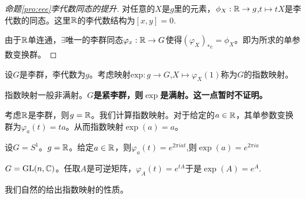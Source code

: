 \begin{proof}[命题\ref{pro:eee}李代数同态的提升]
    对任意的$X$是$g$里的元素，$\phi_X:\mathbb{R} \to g$,$t \mapsto tX$是李代数的同态。这里$\mathbb{R}$的李代数结构为$[x,y]=0$.

    由于$\mathbb{R}$单连通，$\exists$唯一的李群同态$\varphi_x:\mathbb{R} \to G$使得$(\varphi_X)_{*e}=\phi_X$。即为所求的单参数变换群。
\end{proof}
\begin{definition}[李群的指数映射]
    设$G$是李群，李代数为$g$。考虑映射$\mathrm{exp}:g \to G$,$X \mapsto \varphi_X(1)$称为$G$的指数映射。
\end{definition}
\begin{remark}
    指数映射一般非满射。\textbf{$G$是紧李群，则$\exp$是满射。这一点暂时不证明。}
\end{remark}
\begin{example}
    考虑$\mathbb{R}$是李群，则$g=\mathbb{R}$。我们计算指数映射。对于给定的$a \in \mathbb{R}$，其单参数变换群为$\varphi_a(t)=ta$。从而指数映射$\exp(a)=a$。
\end{example}
\begin{example}
    设$G=S^1$。$g=\mathbb{R}$。给定$a \in \mathbb{R}$，则$\varphi_a(t)=e^{2\pi i at}$,则$\exp(a)=e^{2\pi i a}$
\end{example}
\begin{example}
    $G=\mathrm{GL}(n,\mathbb{C})$。任取$A$是可逆矩阵，$\varphi_A(t)=e^{tA}$于是$\exp(A)=e^A$.
\end{example}
我们自然的给出指数映射的性质。
